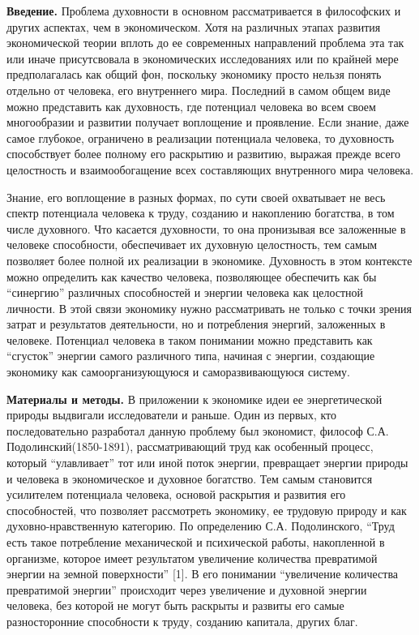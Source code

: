 \begin{multicols}{2}
{\bfseries Введение.} Проблема духовности в основном рассматривается в
философских и других аспектах, чем в экономическом. Хотя на различных
этапах развития экономической теории вплоть до ее современных
направлений проблема эта так или иначе присутсвовала в экономических
исследованиях или по крайней мере предполагалась как общий фон,
поскольку экономику просто нельзя понять отдельно от человека, его
внутреннего мира. Последний в самом общем виде можно представить как
духовность, где потенциал человека во всем своем многообразии и развитии
получает воплощение и проявление. Если знание, даже самое глубокое,
ограничено в реализации потенциала человека, то духовность способствует
более полному его раскрытию и развитию, выражая прежде всего целостность
и взаимообогащение всех составляющих внутренного мира человека.

Знание, его воплощение в разных формах, по сути своей охватывает не весь
спектр потенциала человека к труду, созданию и накоплению богатства, в
том числе духовного. Что касается духовности, то она пронизывая все
заложенные в человеке способности, обеспечивает их духовную целостность,
тем самым позволяет более полной их реализации в экономике. Духовность в
этом контексте можно определить как качество человека, позволяющее
обеспечить как бы ``синергию'' различных способностей и энергии человека
как целостной личности. В этой связи экономику нужно рассматривать не
только с точки зрения затрат и результатов деятельности, но и
потребления энергий, заложенных в человеке. Потенциал человека в таком
понимании можно представить как ``сгусток'' энергии самого различного
типа, начиная с энергии, создающие экономику как самоорганизующуюся и
саморазвивающуюся систему.

{\bfseries Материалы и методы.} В приложении к экономике идеи ее
энергетической природы выдвигали исследователи и раньше. Один из первых,
кто последовательно разработал данную проблему был экономист, философ
С.А. Подолинский(1850-1891), рассматривающий труд как особенный процесс,
который ``улавливает'' тот или иной поток энергии, превращает энергии
природы и человека в экономическое и духовное богатство. Тем самым
становится усилителем потенциала человека, основой раскрытия и развития
его способностей, что позволяет рассмотреть экономику, ее трудовую
природу и как духовно-нравственную категорию. По определению С.А.
Подолинского, ``Труд есть такое потребление механической и психической
работы, накопленной в организме, которое имеет результатом увеличение
количества превратимой энергии на земной поверхности'' {[}1{]}. В его
понимании ``увеличение количества превратимой энергии'' происходит через
увеличение и духовной энергии человека, без которой не могут быть
раскрыты и развиты его самые разносторонние способности к труду,
созданию капитала, других благ.


\end{multicols}

